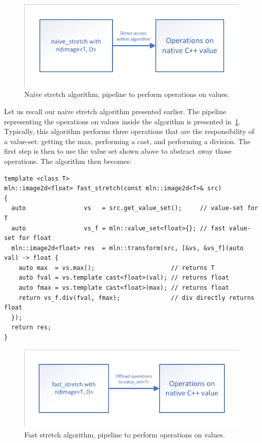 \begin{figure}[htbp]
  \centering
  \includegraphics[width=.8\linewidth]{figs/static_dynamic_bridge/naive_stretch}
  \caption{Naive stretch algorithm, pipeline to perform operations on values.}
  \label{fig:static_dyn.naive_stretch}
\end{figure}

Let us recall our naive stretch algorithm presented earlier. The pipeline representing the operations on values inside
the algorithm is presented in~\cref{fig:static_dyn.naive_stretch}. Typically, this algorithm performs three operations
that are the responsibility of a value-set: getting the max, performing a cast, and performing a division. The first
step is then to use the value set shown above to abstract away those operations. The algorithm then becomes:
\begin{verbatim}
template <class T>
mln::image2d<float> fast_stretch(const mln::image2d<T>& src)
{
  auto                vs   = src.get_value_set();     // value-set for T
  auto                vs_f = mln::value_set<float>{}; // fast value-set for float
  mln::image2d<float> res  = mln::transform(src, [&vs, &vs_f](auto val) -> float {
    auto max  = vs.max();                     // returns T
    auto fval = vs.template cast<float>(val); // returns float
    auto fmax = vs.template cast<float>(max); // returns float
    return vs_f.div(fval, fmax);              // div directly returns float
  });
  return res;
}
\end{verbatim}

\begin{figure}[htbp]
  \centering
  \includegraphics[width=.8\linewidth]{figs/static_dynamic_bridge/fast_stretch}
  \caption{Fast stretch algorithm, pipeline to perform operations on values.}
  \label{fig:static_dyn.fast_stretch}
\end{figure}

